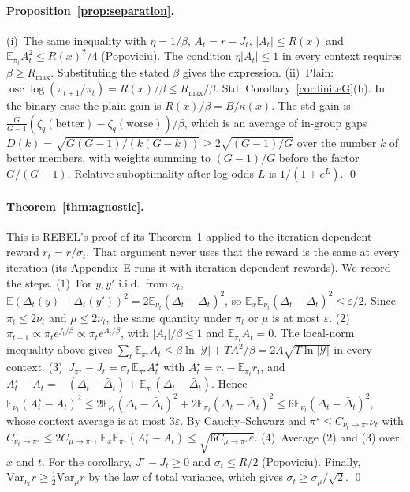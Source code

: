 \documentclass[11pt]{article}
\theoremstyle{definition}
\theoremstyle{remark}
\newcommand{\E}{\mathbb{E}}
\newcommand{\Var}{\mathrm{Var}}
\newcommand{\osc}{\operatorname*{osc}}
\newcommand{\cY}{\mathcal{Y}}
\newcommand{\1}{\mathbb{1}}
\begin{document}
\paragraph{Proposition~\ref{prop:separation}.} (i)~The same inequality with $\eta=1/\beta$,
$A_t=r-J_t$, $|A_t|\le R(x)$ and $\E_{\pi_t}A_t^2\le R(x)^2/4$ (Popoviciu). The condition
$\eta|A_t|\le1$ in every context requires $\beta\ge R_{\max}$. Substituting the stated
$\beta$ gives the expression. (ii)~Plain: $\osc\log(\pi_{t+1}/\pi_t)=R(x)/\beta\le R_{\max}/\beta$.
Std: Corollary~\ref{cor:finiteG}(b). In the binary case the plain gain is
$R(x)/\beta=B/\kappa(x)$. The std gain is
$\frac{G}{G-1}(\zeta_q(\mathrm{better})-\zeta_q(\mathrm{worse}))/\beta$, which is an average
of in-group gaps $D(k)=\sqrt{G(G-1)/(k(G-k))}\ge2\sqrt{(G-1)/G}$ over the number $k$ of better
members, with weights summing to $(G-1)/G$ before the factor $G/(G-1)$. Relative
suboptimality after log-odds $L$ is $1/(1+e^{L})$. \qed

\paragraph{Theorem~\ref{thm:agnostic}.} This is REBEL's proof of its Theorem~1 applied to
the iteration-dependent reward $r_t=r/\sigma_t$. That argument never uses that the
reward is the same at every iteration (its Appendix~E runs it with iteration-dependent
rewards). We record the steps.
(1)~For $y,y'$ i.i.d.\ from $\nu_t$,
$\E(\Delta_t(y)-\Delta_t(y'))^2=2\E_{\nu_t}(\Delta_t-\bar\Delta_t)^2$, so
$\E_x\E_{\nu_t}(\Delta_t-\bar\Delta_t)^2\le\varepsilon/2$. Since $\pi_t\le2\nu_t$ and $\mu\le2\nu_t$,
the same quantity under $\pi_t$ or $\mu$ is at most $\varepsilon$.
(2)~$\pi_{t+1}\propto\pi_te^{f_t/\beta}\propto\pi_te^{A_t/\beta}$, with $|A_t|/\beta\le1$ and
$\E_{\pi_t}A_t=0$. The local-norm inequality above gives
$\sum_t\E_{\pi^\star}A_t\le\beta\ln|\cY|+TA^2/\beta=2A\sqrt{T\ln|\cY|}$ in every context.
(3)~$J_{\pi^\star}-J_t=\sigma_t\,\E_{\pi^\star}A_t^\star$ with $A_t^\star=r_t-\E_{\pi_t}r_t$, and
$A_t^\star-A_t=-(\Delta_t-\bar\Delta_t)+\E_{\pi_t}(\Delta_t-\bar\Delta_t)$. Hence
$\E_{\nu_t}(A^\star_t-A_t)^2\le2\E_{\nu_t}(\Delta_t-\bar\Delta_t)^2+2\E_{\pi_t}(\Delta_t-\bar\Delta_t)^2\le6\E_{\nu_t}(\Delta_t-\bar\Delta_t)^2$,
whose context average is at most $3\varepsilon$. By Cauchy--Schwarz and
$\pi^\star\le C_{\nu_t\to\pi^\star}\nu_t$ with $C_{\nu_t\to\pi^\star}\le2C_{\mu\to\pi^\star}$,
$\E_x\E_{\pi^\star}(A_t^\star-A_t)\le\sqrt{6C_{\mu\to\pi^\star}\varepsilon}$.
(4)~Average (2) and (3) over $x$ and $t$. For the corollary, $J^\star-J_t\ge0$ and
$\sigma_t\le R/2$ (Popoviciu). Finally,
$\Var_{\nu_t}r\ge\frac12\Var_\mu r$ by the law of total variance, which gives
$\sigma_t\ge\sigma_\mu/\sqrt2$. \qed
\end{document}
